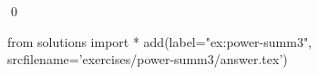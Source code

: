 
\begin{ex} 
  \label{ex:power-summ3}
  
  \qed
\end{ex} 
\begin{python0}
from solutions import *
add(label="ex:power-summ3",
    srcfilename='exercises/power-summ3/answer.tex') 
\end{python0}
